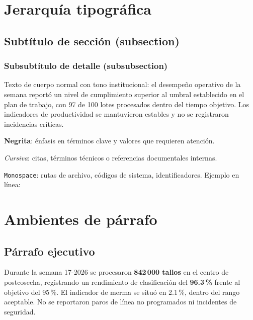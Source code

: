 \documentclass{../base/canon}
\begin{document}
\section{Jerarquía tipográfica}

\subsection{Subtítulo de sección (subsection)}

\subsubsection{Subsubtítulo de detalle (subsubsection)}

Texto de cuerpo normal con tono institucional: el desempeño operativo de la semana
reportó un nivel de cumplimiento superior al umbral establecido en el plan de trabajo,
con 97 de 100 lotes procesados dentro del tiempo objetivo.  Los indicadores de
productividad se mantuvieron estables y no se registraron incidencias críticas.

\medskip
\textbf{Negrita}: énfasis en términos clave y valores que requieren atención.

\medskip
\textit{Cursiva}: citas, términos técnicos o referencias documentales internas.

\medskip
\texttt{Monospace}: rutas de archivo, códigos de sistema, identificadores.
Ejemplo en línea: 

\section{Ambientes de párrafo}

\subsection{Párrafo ejecutivo}

\begin{ParrafoEjecutivo}
Durante la semana 17-2026 se procesaron \textbf{842\,000 tallos} en el centro de
postcosecha, registrando un rendimiento de clasificación del \textbf{96.3\,\%} frente
al objetivo del 95\,\%.  El indicador de merma se situó en 2.1\,\%, dentro del rango
aceptable.  No se reportaron paros de línea no programados ni incidentes de seguridad.
\end{ParrafoEjecutivo}
\end{document}
